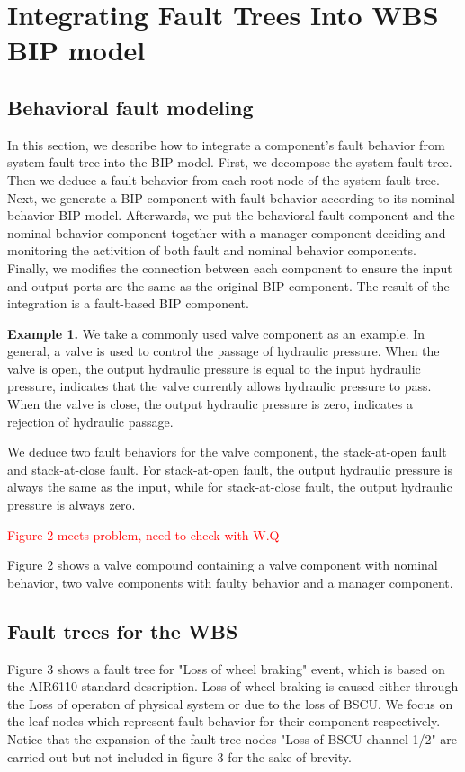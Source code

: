 \documentclass[conference]{IEEEtran}
\begin{document}
\section{Integrating Fault Trees Into WBS BIP model}

\subsection{Behavioral fault modeling}
In this section, we describe how to integrate a component's fault behavior from system fault tree into the BIP model. First, we decompose the system fault tree. Then we deduce a fault behavior from each root node of the system fault tree. Next, we generate a BIP component with fault behavior according to its nominal behavior BIP model. Afterwards, we put the behavioral fault component and the nominal behavior component together with a manager component deciding and monitoring the activition of both fault and nominal behavior components. Finally, we modifies the connection between each component to ensure the input and output ports are the same as the original BIP component. The result of the integration is a fault-based BIP component.

\textbf{Example 1.} We take a commonly used valve component as an example. In general, a valve is used to control the passage of hydraulic pressure. When the valve is open, the output hydraulic pressure is equal to the input hydraulic pressure, indicates that the valve currently allows hydraulic pressure to pass. When the valve is close, the output hydraulic pressure is zero, indicates a rejection of hydraulic passage.

We deduce two fault behaviors for the valve component, the stack-at-open fault and stack-at-close fault. For stack-at-open fault, the output hydraulic pressure is always the same as the input, while for stack-at-close fault, the output hydraulic pressure is always zero.

\textcolor{red}{
	Figure 2 meets problem, need to check with W.Q
}

Figure 2 shows a valve compound containing a valve component with nominal behavior, two valve components with faulty behavior and a manager component.

\subsection{Fault trees for the WBS}
Figure 3 shows a fault tree for "Loss of wheel braking" event, which is based on the AIR6110 standard description. Loss of wheel braking is caused either through the Loss of operaton of physical system or due to the loss of BSCU. We focus on the leaf nodes which represent fault behavior for their component respectively. Notice that the expansion of the fault tree nodes "Loss of BSCU channel 1/2" are carried out but not included in figure 3 for the sake of brevity. 
\end{document}
